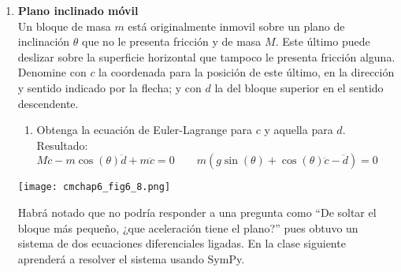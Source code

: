 \documentclass[11pt, a4paper, twoside]{article}
\begin{document}
\begin{enumerate}
\item
	\begin{minipage}[t][4.5cm]{0.7\textwidth}
		\textbf{Plano inclinado móvil}\\
		Un bloque de masa \(m\) está originalmente inmovil sobre un plano de inclinación \(\theta\) que no le presenta fricción y de masa \(M\).
		Este último puede deslizar sobre la superficie horizontal que tampoco le presenta fricción alguna.
		Denomine con \(c\) la coordenada para la posición de este último, en la dirección y sentido indicado por la flecha; y con \(d\) la del bloque superior en el sentido descendente.
		\begin{enumerate}
			\item Obtenga la ecuación de Euler-Lagrange para \(c\) y aquella para \(d\).\\ 
			Resultado:
	\(
		M \ddot{c} - m \cos{\left(\theta \right)} \ddot{d} + m \ddot{c} = 0
		\qquad
		m \left(g \sin{\left(\theta \right)} + \cos{\left(\theta \right)} \ddot{c} - \ddot{d }\right) = 0
	\)
		\end{enumerate}
	\end{minipage}
	\begin{minipage}[c][0cm][t]{0.3\textwidth}
		\texttt{[image: cmchap6\_fig6\_8.png]}
	\end{minipage}
	Habrá notado que no podría responder a una pregunta como ``De soltar el bloque más pequeño, ¿que aceleración tiene el plano?'' pues obtuvo un sistema de dos ecuaciones diferenciales ligadas.
	En la clase siguiente aprenderá a resolver el sistema usando SymPy.
	




\end{enumerate}
\end{document}
